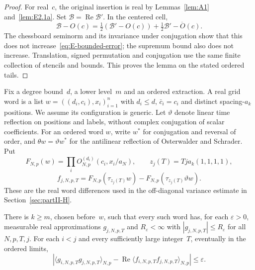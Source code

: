 \begin{proof}
For real~$c$, the original insertion is real by Lemmas~\ref{lem:A1} and~\ref{lem:E2.1a}. Set $\mathcal B=\operatorname{Re}\mathcal B'$. In the centered cell,
\begin{equation*}
 \mathcal B-O(c)=\tfrac12(\mathcal B'-O(c))+\tfrac12\overline{\mathcal B'-O(c)}.
\end{equation*}
The chessboard seminorm and its invariance under conjugation show that this does not increase~\eqref{eq:E-bounded-error}; the supremum bound also does not increase. Translation, signed permutation and conjugation use the same finite collection of stencils and bounds. This proves the lemma on the stated ordered tails.
\end{proof}

Fix a degree bound~$d$, a lower level~$m$ and an ordered extraction. A real grid word is a list $w=((d_i,c_i),x_i)_{i=1}^n$ with $d_i\le d$, $\bar c_i=c_i$ and distinct spacing-$a_k$ positions. We assume its configuration is generic. Let $\vartheta$ denote linear time reflection on positions and labels, without complex conjugation of scalar coefficients. For an ordered word $w$, write $w^*$ for conjugation and reversal of order, and $\theta w=\vartheta w^*$ for the antilinear reflection of Osterwalder and Schrader. Put
\begin{equation*}
 F_{N,p}(w)=\prod_iO^{(d_i)}_{N,p}(c_i,x_i/a_N),\qquad
 z_j(T)=Tj a_k(1,1,1,1),
\end{equation*}
\begin{equation*}
 f_{j,N,p,T}=F_{N,p}(\tau_{z_j(T)}w)
             -F_{N,p}(\tau_{z_j(T)}\vartheta w).
\end{equation*}
These are the real word differences used in the off-diagonal variance estimate in Section~\ref{sec:partII-H}.
\begin{lemma}\label{lem:E2-bounded-real}
There is $k\ge m$, chosen before~$w$, such that every such word has, for each $\varepsilon>0$, measurable real approximations $g_{j,N,p,T}$ and $R_\varepsilon<\infty$ with $|g_{j,N,p,T}|\le R_\varepsilon$ for all $N,p,T,j$. For each $i<j$ and every sufficiently large integer~$T$, eventually in the ordered limits,
\begin{equation*}
 \left|\langle g_{i,N,p,T}g_{j,N,p,T}\rangle_{N,p}
 -\operatorname{Re}\langle f_{i,N,p,T}f_{j,N,p,T}\rangle_{N,p}\right|\le\varepsilon.
\end{equation*}
\end{lemma}
